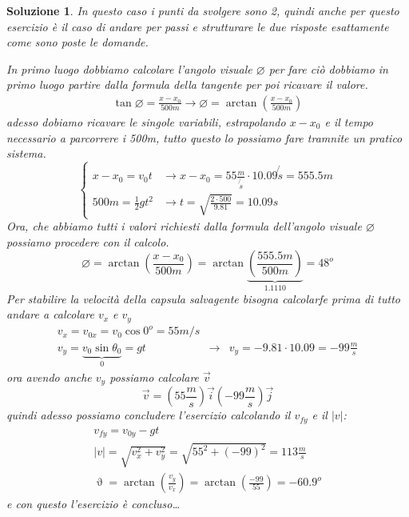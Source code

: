 \documentclass{article}
\newcommand{\abs}[1]{\lvert#1\rvert}
\newtheorem{sol}{Soluzione}[section]
\begin{document}
\begin{sol}
  In questo caso i punti da svolgere sono 2, quindi anche per questo esercizio è il caso di andare per passi e strutturare le due risposte esattamente come sono poste le domande.
  \begin{tasks}
    \task In primo luogo dobbiamo calcolare l'angolo visuale $\varnothing$ per fare ciò dobbiamo in primo luogo partire dalla formula della tangente per poi ricavare il valore.
    \begin{eqnarray*}
      \tan\varnothing{}=\frac{x-x_0}{500m} \to \varnothing{}=\arctan\left(\frac{x-x_0}{500m}\right)
    \end{eqnarray*}
    adesso dobiamo ricavare le singole variabili, estrapolando $x-x_0$ e il tempo necessario a parcorrere i 500m, tutto questo lo possiamo fare tramnite un pratico sistema.
    \begin{equation*}
      \begin{cases}
        x-x_0=v_0t & \to x-x_0=55\frac{m}{\not{s}}\cdot10.09\not{s}=555.5m\\
        500m=\frac{1}{2}gt^2&\to t=\sqrt{\frac{2\cdot 500}{9.81}}=10.09s
      \end{cases}
    \end{equation*}
    Ora, che abbiamo tutti i valori richiesti dalla formula dell'angolo visuale $\varnothing$ possiamo procedere con il calcolo.
    \begin{equation*}
      \varnothing{}=\arctan\left(\frac{x-x_0}{500m}\right) = \arctan{}\underbrace{\left(\frac{555.5m}{500m}\right)}_{1.1110}=48^o
    \end{equation*}
    \task Per stabilire la velocità della capsula salvagente bisogna calcolarfe prima di tutto andare a calcolare $v_x$ e $v_y$
    \begin{equation*}
      \begin{matrix}
        v_x=v_{0x}=v_0\cos0^o=55m/s\\
        v_y=\underbrace{v_0\sin\theta_0}_0=gt & \to & v_y=-9.81\cdot 10.09=-99\frac{m}{s}
      \end{matrix}
    \end{equation*}
    ora avendo anche $v_y$ possiamo calcolare $\vec{v}$
    \begin{equation*}
      \vec{v}=\left(55\frac{m}{s}\right)\vec{i}\left(-99\frac{m}{s}\right)\vec{j}
    \end{equation*}
    quindi adesso possiamo concludere l'esercizio calcolando il $v_{fy}$ e il $\abs{v}$:
    \begin{eqnarray*}
      v_{fy}=v_{0y}-gt\\
      \abs{v}=\sqrt{v_x^2+v_y^2}=\sqrt{55^2+(-99)^2}=113\frac{m}{s}\\
      \upvartheta=\arctan\left(\frac{v_y}{v_x}\right)=\arctan\left(\frac{-99}{55}\right)=-60.9^o
    \end{eqnarray*}
    e con questo l'esercizio è concluso\dots
  \end{tasks}
\end{sol}
\end{document}
